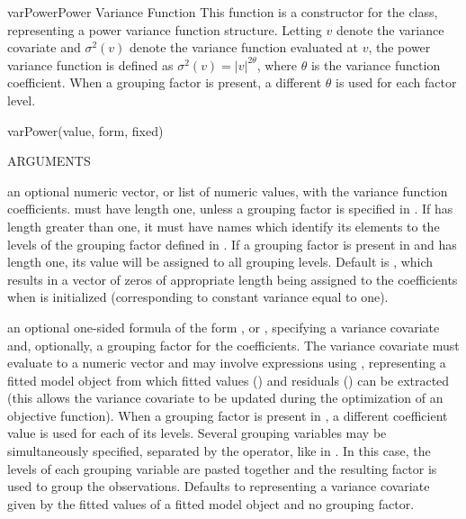 \documentclass[pdftex]{article} \usepackage{url,graphicx}
\renewcommand{\Twiddle}{\mbox{\(\sim\)}}
\begin{document}
\begin{Helpfile}{varPower}{Power Variance Function}
This function is a constructor for the  class,
representing a power variance function structure. Letting
$v$ denote the variance covariate and $\sigma^2(v)$
denote the variance function evaluated at $v$, the power
variance function is defined as $\sigma^2(v) = |v|^{2\theta}$, where
$\theta$ is the variance function coefficient. When a grouping factor
is present, a different $\theta$ is used for each factor level.
\begin{Example}
varPower(value, form, fixed)
\end{Example}
\begin{Argument}{ARGUMENTS}
\item[\Co{value:}]
an optional numeric vector, or list of numeric values,
with the variance function coefficients.  must have
length one, unless a grouping factor is specified in .
If  has length greater than one, it must have names
which identify its elements to the levels of the grouping factor
defined in . If a grouping factor is present in
 and  has length one, its value will be
assigned to all grouping levels. Default is , which
results in a vector of zeros of appropriate length being assigned to
the coefficients when  is initialized (corresponding
to constant variance equal to one).
\item[\Co{form:}] an optional one-sided formula of the form
  \Co{\Twiddle v}, or \Co{\Twiddle v | g}, specifying a variance
  covariate  and, optionally, a grouping factor  for the
  coefficients. The variance covariate must evaluate to a numeric
  vector and may involve expressions using , representing a
  fitted model object from which fitted values () and
  residuals () can be extracted (this allows the variance
  covariate to be updated during the optimization of an objective
  function). When a grouping factor is present in , a
  different coefficient value is used for each of its levels. Several
  grouping variables may be simultaneously specified, separated by the
  \Co{*} operator, like in \Co{{\Twiddle} v | g1 * g2 * g3}. In this
  case, the levels of each grouping variable are pasted together and
  the resulting factor is used to group the observations. Defaults to
  \Co{\Twiddle fitted(.)} representing a variance covariate given by
  the fitted values of a fitted model object and no grouping factor.
\item[\Co{fixed:}]

\end{Argument}
\end{Helpfile}
\end{document}

